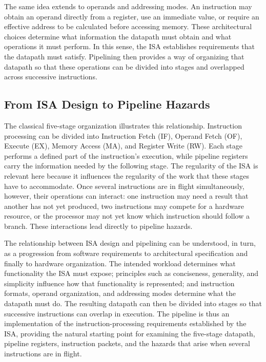 \documentclass[12pt,a4paper]{report}
\begin{document}
The same idea extends to operands and addressing modes. An instruction may obtain an operand directly from a register, use an immediate value, or require an effective address to be calculated before accessing memory. These architectural choices determine what information the datapath must obtain and what operations it must perform. In this sense, the ISA establishes requirements that the datapath must satisfy. Pipelining then provides a way of organizing that datapath so that these operations can be divided into stages and overlapped across successive instructions.~\cite{sarangi}

\subsection{From ISA Design to Pipeline Hazards}

The classical five-stage organization illustrates this relationship. Instruction processing can be divided into Instruction Fetch (IF), Operand Fetch (OF), Execute (EX), Memory Access (MA), and Register Write (RW). Each stage performs a defined part of the instruction's execution, while pipeline registers carry the information needed by the following stage. The regularity of the ISA is relevant here because it influences the regularity of the work that these stages have to accommodate. Once several instructions are in flight simultaneously, however, their operations can interact: one instruction may need a result that another has not yet produced, two instructions may compete for a hardware resource, or the processor may not yet know which instruction should follow a branch. These interactions lead directly to pipeline hazards.

The relationship between ISA design and pipelining can be understood, in turn, as a progression from software requirements to architectural specification and finally to hardware organization. The intended workload determines what functionality the ISA must expose; principles such as conciseness, generality, and simplicity influence how that functionality is represented; and instruction formats, operand organization, and addressing modes determine what the datapath must do. The resulting datapath can then be divided into stages so that successive instructions can overlap in execution. The pipeline is thus an implementation of the instruction-processing requirements established by the ISA, providing the natural starting point for examining the five-stage datapath, pipeline registers, instruction packets, and the hazards that arise when several instructions are in flight.~\cite{sarangi} ~\cite{hennessy}
\end{document}
